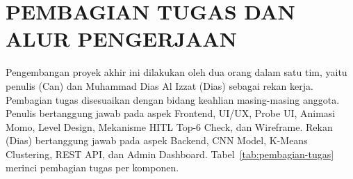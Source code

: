 \documentclass[12pt,a4paper,oneside,openany]{report}
\begin{document}
\section{PEMBAGIAN TUGAS DAN ALUR PENGERJAAN}
\label{sec:pembagian-tugas}

Pengembangan proyek akhir ini dilakukan oleh dua orang dalam satu tim, yaitu penulis (Can) dan Muhammad Dias Al Izzat (Dias) sebagai rekan kerja. Pembagian tugas disesuaikan dengan bidang keahlian masing-masing anggota. Penulis bertanggung jawab pada aspek Frontend, UI/UX, Probe UI, Animasi Momo, Level Design, Mekanisme HITL Top-6 Check, dan Wireframe. Rekan (Dias) bertanggung jawab pada aspek Backend, CNN Model, K-Means Clustering, REST API, dan Admin Dashboard. Tabel~\ref{tab:pembagian-tugas} merinci pembagian tugas per komponen.
\end{document}
